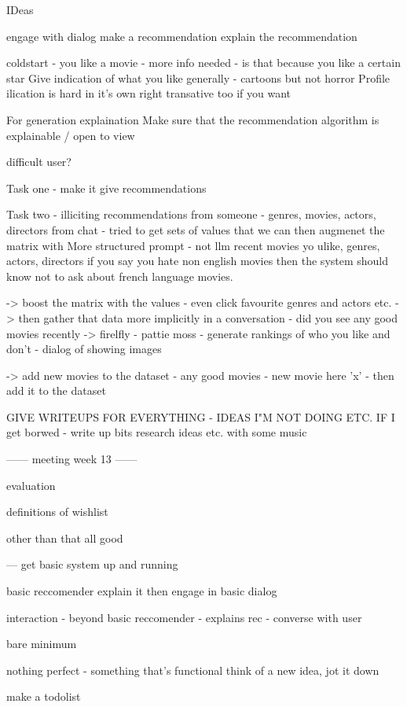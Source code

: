 


IDeas

engage with dialog
make a recommendation
explain the recommendation

coldstart
- you like a movie - more info needed
- is that because you like a certain star
Give indication of what you like generally - cartoons but not horror
Profile ilication is hard in it's own right
transative too if you want


For generation explaination
Make sure that the recommendation algorithm is explainable / open to view


difficult user?


Task one - make it give recommendations

Task two - illiciting recommendations from someone - genres, movies, actors, directors
from chat - tried to get sets of values that we can then augmenet the matrix with
More structured prompt - not llm
recent movies yo ulike, genres, actors, directors
if you say you hate non english movies then the system should know not to ask about french language movies.

-> boost the matrix with the values - even click favourite genres and actors etc.
-> then gather that data more implicitly in a conversation - did you see any good movies recently
-> firelfly - pattie moss - generate rankings of who you like and don't - dialog of showing images

-> add new movies to the dataset - any good movies - new movie here 'x' - then add it to the dataset




GIVE WRITEUPS FOR EVERYTHING - IDEAS I"M NOT DOING ETC.
IF I get borwed - write up bits research ideas etc. with some music




------
meeting week 13
------

evaluation

definitions of wishlist

other than that all good


---
get basic system up and running

basic reccomender
explain it
then engage in basic dialog

interaction - beyond basic reccomender
- explains rec
- converse with user


bare minimum

nothing perfect - something that's functional
think of a new idea, jot it down 

make a todolist


